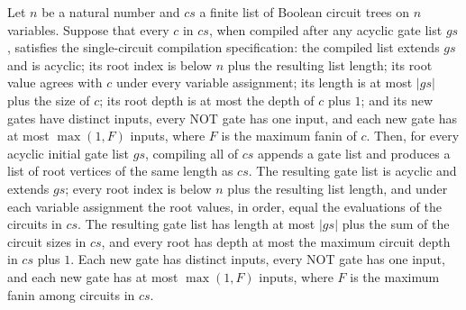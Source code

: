 \begin{theorem}
\label{BoolCircuit.compileTrees_spec}
\leanok
{}
Let $n$ be a natural number and $cs$ a finite list of Boolean circuit trees on $n$
variables. Suppose that every $c$ in $cs$, when compiled after any acyclic gate list
$gs$, satisfies the single-circuit compilation specification: the compiled list extends
$gs$ and is acyclic; its root index is below $n$ plus the resulting list length; its
root value agrees with $c$ under every variable assignment; its length is at most $|gs|$
plus the size of $c$; its root depth is at most the depth of $c$ plus $1$; and its new
gates have distinct inputs, every NOT gate has one input, and each new gate has at most
$\max(1,F)$ inputs, where $F$ is the maximum fanin of $c$. Then, for every acyclic
initial gate list $gs$, compiling all of $cs$ appends a gate list and produces a list of
root vertices of the same length as $cs$. The resulting gate list is acyclic and extends
$gs$; every root index is below $n$ plus the resulting list length, and under each
variable assignment the root values, in order, equal the evaluations of the circuits in
$cs$. The resulting gate list has length at most $|gs|$ plus the sum of the circuit
sizes in $cs$, and every root has depth at most the maximum circuit depth in $cs$ plus
$1$. Each new gate has distinct inputs, every NOT gate has one input, and each new gate
has at most $\max(1,F)$ inputs, where $F$ is the maximum fanin among circuits in $cs$.
\end{theorem}

